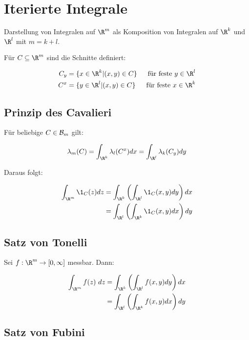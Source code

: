 \section*{Iterierte Integrale}

Darstellung von Integralen auf $\R^m$ als Komposition von Integralen auf $\R^k$ und $\R^l$ mit $m = k + l$.

Für $C \subseteq \R^m$ sind die Schnitte definiert:

\vspace{-4mm}
\begin{align*}
	C_y &= \{ x \in \R^k | (x,y) \in C \} &\text{ für feste } y \in \R^l\\
	C^x &= \{ y \in \R^l | (x,y) \in C \} &\text{ für feste } x \in \R^k
\end{align*}

\subsection*{Prinzip des Cavalieri}

Für beliebige $C \in \mathcal{B}_m$ gilt:

\[ \lambda_m(C) = \int_{\R^k} \lambda_l(C^x) dx = \int_{\R^l} \lambda_k(C_y) dy \]

Daraus folgt:

\vspace{-4mm}
\begin{align*}
\int_{\R^m} \1_C(z) dz &= \int_{\R^k} \left( \int_{\R^l} \1_C(x,y) dy \right) dx\\
                         &= \int_{\R^l} \left( \int_{\R^k} \1_C(x,y) dx \right) dy
\end{align*}

\subsection*{Satz von Tonelli}

Sei $f : \R^m \to [0,\infty]$ messbar. Dann:

\vspace{-4mm}
\begin{align*}
	\int_{\R^m} f(z) \ dz &= \int_{\R^k} \left( \int_{\R^l} f(x,y) dy \right) dx\\
	               &= \int_{\R^l} \left( \int_{\R^k} f(x,y) dx \right) dy
\end{align*}

\subsection*{Satz von Fubini}

